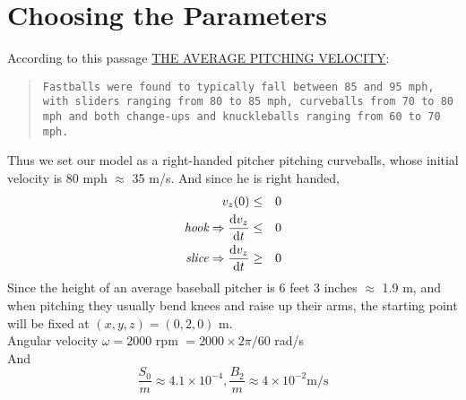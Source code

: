 \documentclass{article}
\newcommand{\ud}{\mathrm{d}}
\begin{document}
\section{Choosing the Parameters}
According to this passage \href{http://www.livestrong.com/article/501890-the-average-pitching-velocity/}{THE AVERAGE PITCHING VELOCITY}:\\
\begin{quotation}
\tt Fastballs were found to typically fall between 85 and 95 mph, with sliders ranging from 80 to 85 mph, curveballs from 70 to 80 mph and both change-ups and knuckleballs ranging from 60 to 70 mph.\\
\end{quotation}
Thus we set our model as a right-handed pitcher pitching curveballs, whose initial velocity is 80 mph $\approx$ 35 m/s. And since he is right handed, 
\begin{eqnarray*}
v_z(0) &\leq& 0 \\
\emph{hook}\Rightarrow \frac{\ud v_z}{\ud t} &\leq& 0\\
\emph{slice}\Rightarrow \frac{\ud v_z}{\ud t}&\geq& 0
\end{eqnarray*}
Since the height of an average baseball pitcher is 6 feet 3 inches $\approx$ 1.9 m, and when pitching they usually bend knees and raise up their arms, the starting point will be fixed at $(x,y,z)=(0,2,0)$ m.\\
Angular velocity $\omega=2000$ rpm $=2000\times 2\pi /60$ rad/s\\
And $$\frac{S_0}{m}\approx 4.1\times 10^{-4}, \frac{B_2}{m}\approx 4\times 10^{-2}\textrm{m/s}$$
\newpage
\end{document}
